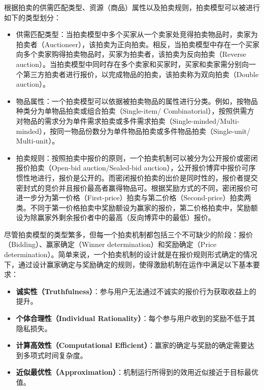

根据拍卖的供需匹配类型、资源（商品）属性以及拍卖规则，拍卖模型可以被进行如下的类型划分：
\begin{itemize}
\item 供需匹配类型：当拍卖模型中多个买家从一个卖家处竞得拍卖物品时，卖家为拍卖者（Auctioneer），该拍卖为正向拍卖。相反，当拍卖模型中存在一个买家向多个卖家购得拍卖物品时，买家为拍卖者，该拍卖为反向拍卖（Reverse auction）。当拍卖模型中同时存在多个卖家和买家时，买家和卖家需分别向一个第三方拍卖者进行报价，以完成物品的拍卖，该拍卖称为双向拍卖（Double auction）。
\item 物品属性：一个拍卖模型可以依据被拍卖物品的属性进行分类。例如，按物品种类分为单物品拍卖或组合拍卖（Single-item/ Combinatorial），按照供需方对物品的需求分为单件需求拍卖或多件需求拍卖（Single-minded/Multi-minded），按同一物品份数分为单件物品拍卖或多件物品拍卖（Single-unit/ Multi-unit）。
\item 拍卖规则：按照拍卖中报价的原则，一个拍卖机制可以被分为公开报价或密闭报价拍卖（Open-bid auction/Sealed-bid auction），公开报价博弈中报价可序惯性地进行，报价是公开的。而密闭报价拍卖的出价是同时性的，报价者提交密封式的竞价并且报价最高者赢得物品可。根据奖励方式的不同，密闭报价可进一步分为第一价格（First-price）拍卖与第二价格（Second-price）拍卖两类。不同于第一价格拍卖中奖励额设为赢家的报价，第二价格拍卖中，奖励额设为除赢家外剩余报价者中的最高（反向博弈中的最低）报价。
\end{itemize}
尽管拍卖模型的类型繁多，但每一个拍卖机制都包括三个不可缺少的阶段：报价（Bidding）、赢家确定（Winner determination）和奖励确定（Price determination）。简单来说，一个拍卖机制的设计就是在报价规则形式确定的情况下，通过设计赢家确定与奖励确定的规则，使得激励机制在运作中满足以下基本要求：
\begin{itemize}
\item \textbf{诚实性（Truthfulness）}：参与用户无法通过不诚实的报价行为获取收益上的提升。
\item \textbf{个体合理性（Individual Rationality）}：每个参与用户收到的奖励不低于其隐私损失。
\item \textbf{计算高效性（Computational Efficient）}：赢家的确定与奖励的确定需要达到多项式时间复杂度。
\item \textbf{近似最优性（Approximation）}：机制运行所得到的效用近似接近于目标最优值。
\end{itemize}
